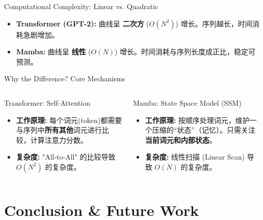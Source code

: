 \documentclass{beamer}
\begin{document}
\begin{CJK}{UTF8}{gbsn}
\begin{frame}{Computational Complexity: Linear vs. Quadratic}
    \begin{itemize}
        \item \textbf{Transformer (GPT-2):} 曲线呈 \textbf{二次方} ($O(N^2)$) 增长。序列越长，时间消耗急剧增加。
        \item \textbf{Mamba:} 曲线呈 \textbf{线性} ($O(N)$) 增长。时间消耗与序列长度成正比，稳定可预测。
    \end{itemize}
\end{frame}

\begin{frame}{Why the Difference? Core Mechanisms}
    \begin{columns}[T]
        \begin{column}{0.5\textwidth}
            \begin{alertblock}{Transformer: Self-Attention}
                \begin{itemize}
                    \item \textbf{工作原理:} 每个词元(token)都需要与序列中\textbf{所有其他}词元进行比较，计算注意力分数。
                    \item \textbf{复杂度:} "All-to-All" 的比较导致 $O(N^2)$ 的复杂度。
                \end{itemize}
            \end{alertblock}
        \end{column}
        
        \begin{column}{0.5\textwidth}
            \begin{exampleblock}{Mamba: State Space Model (SSM)}
                \begin{itemize}
                    \item \textbf{工作原理:} 按顺序处理词元，维护一个压缩的“状态”（记忆）。只需关注\textbf{当前词元和内部状态}。
                    \item \textbf{复杂度:} 线性扫描 (Linear Scan) 导致 $O(N)$ 的复杂度。
                \end{itemize}
            \end{exampleblock}
        \end{column}
    \end{columns}
\end{frame}

\section{Conclusion \& Future Work}


\end{CJK}
\end{document}
